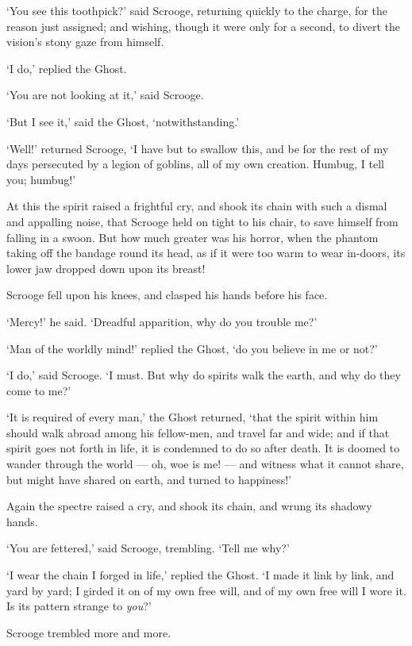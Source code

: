 \documentclass[11pt,twoside]{article}\makeatletter
\begin{document}
‘You see this toothpick?’ said Scrooge, returning quickly to the charge, for the reason just assigned; and wishing, though it were only for a second, to divert the vision's stony gaze from himself.  \par
‘I do,’ replied the Ghost.  \par
‘You are not looking at it,’ said Scrooge.  \par
‘But I see it,’ said the Ghost, ‘notwithstanding.’\par
‘Well!’ returned Scrooge, ‘I have but to swallow this, and be for the rest of my days persecuted by a legion of goblins, all of my own creation.  Humbug, I tell you; humbug!’\par
At this the spirit raised a frightful cry, and shook its chain with such a dismal and appalling noise, that Scrooge held on tight to his chair, to save himself from falling in a swoon. But how much greater was his horror, when the phantom taking off the bandage round its head, as if it were too warm to wear in-doors, its lower jaw dropped down upon its breast!  \par
Scrooge fell upon his knees, and clasped his hands before his face.  \par
‘Mercy!’ he said.  ‘Dreadful apparition, why do you trouble me?’\par
‘Man of the worldly mind!’ replied the Ghost, ‘do you believe in me or not?’\par
‘I do,’ said Scrooge.  ‘I must.  But why do spirits walk the earth, and why do they come to me?’\par
‘It is required of every man,’ the Ghost returned, ‘that the spirit within him should walk abroad among his fellow-men, and travel far and wide; and if that spirit goes not forth in life, it is condemned to do so after death.  It is doomed to wander through the world — oh, woe is me! — and witness what it cannot share, but might have shared on earth, and turned to happiness!’\par
Again the spectre raised a cry, and shook its chain, and wrung its shadowy hands.  \par
‘You are fettered,’ said Scrooge, trembling.  ‘Tell me why?’\par
‘I wear the chain I forged in life,’ replied the Ghost.  ‘I made it link by link, and yard by yard; I girded it on of my own free will, and of my own free will I wore it.  Is its pattern strange to \textit{you}?’\par
Scrooge trembled more and more.  \par
\end{document}

